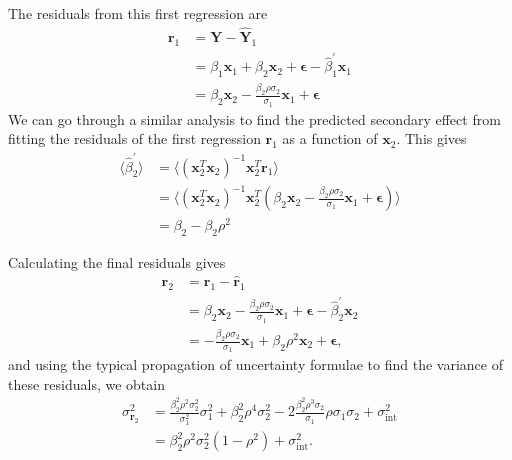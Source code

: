 The residuals from this first regression are
\begin{align*}
    \bm{r}_1 &= \bm{Y}-\bm{\hat{Y}}_1 \\
    &= \beta_1\bm{x}_1 + \beta_2\bm{x}_2 + \bm{\epsilon}-\hat{\beta}_1^\prime\bm{x}_1\\
    &= \beta_2\bm{x}_2 - \frac{\beta_2\rho\sigma_2}{\sigma_1}\bm{x}_1 + \bm{\epsilon}
\end{align*}
We can go through a similar analysis to find the predicted secondary effect from fitting the residuals of the first regression $\bm{r}_1$ as a function of $\bm{x}_2$. This gives
\begin{align*}
    \langle\hat{\beta}_2^\prime\rangle &= \langle(\bm{x}_2^T\bm{x}_2)^{-1}\bm{x}_2^T\bm{r}_1\rangle\\
    &= \langle(\bm{x}_2^T\bm{x}_2)^{-1}\bm{x}_2^T(\beta_2\bm{x}_2 - \frac{\beta_2\rho\sigma_2}{\sigma_1}\bm{x}_1 + \bm{\epsilon})\rangle\\
    &= \beta_2 - \beta_2\rho^2
\end{align*}

Calculating the final residuals gives
\begin{align*}
    \bm{r}_2 &= \bm{r}_1 - \bm{\hat{r}}_1\\
    &= \beta_2\bm{x}_2 - \frac{\beta_2\rho\sigma_2}{\sigma_1}\bm{x}_1 + \bm{\epsilon} - \hat{\beta}_2^\prime\bm{x}_2\\
    &= - \frac{\beta_2\rho\sigma_2}{\sigma_1}\bm{x}_1 + \beta_2\rho^2\bm{x}_2 + \bm{\epsilon},
\end{align*}
and using the typical propagation of uncertainty formulae to find the variance of these residuals, we obtain
\begin{align*}
    \sigma_{\bm{r}_2}^2 &= \frac{\beta_2^2\rho^2\sigma_2^2}{\sigma_1^2}\sigma_1^2 + \beta_2^2\rho^4\sigma_2^2 - 2\frac{\beta_2^2\rho^3\sigma_2}{\sigma_1}\rho\sigma_1\sigma_2 + \sigma_\text{int}^2\\
    &= \beta_2^2\rho^2\sigma_2^2\left(1-\rho^2\right) + \sigma_\text{int}^2.
\end{align*}

